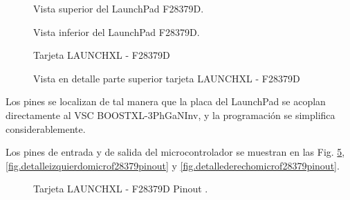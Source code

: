 \documentclass{report}
\begin{document}
\begin{figure}[!h]
    \begin{center}
        \end{center}
        \caption{Vista superior del LaunchPad F28379D.}
        \label{fig.launchpad_superior}
\end{figure}

\begin{figure}[!h]
    \begin{center}
        \end{center}
        \caption{Vista inferior del LaunchPad F28379D.}
        \label{fig.launchpad_inferior}
\end{figure}

\begin{figure}[!h]
    \begin{center}
        \end{center}
        \caption{Tarjeta LAUNCHXL - F28379D \cite{trece}}
        \label{fig.microf28739doverview}
\end{figure}

\begin{figure}[!h]
    \begin{center}
        \end{center}
        \caption{Vista en detalle parte superior tarjeta LAUNCHXL - F28379D \cite{trece}}
        \label{fig.detallemicrof28739doverview}
\end{figure}

Los pines se localizan de tal manera que la placa del LaunchPad se acoplan directamente al VSC BOOSTXL-3PhGaNInv, y la programación se simplifica considerablemente. 

Los pines de entrada y de salida del microcontrolador se muestran en las Fig. \ref{fig.microf28379pinout}, \ref{fig.detalleizquierdomicrof28379pinout} y \ref{fig.detallederechomicrof28379pinout}. 

\begin{figure}[!h]
    \begin{center}
        \end{center}
        \caption{Tarjeta LAUNCHXL - F28379D Pinout \cite{catorce}.}
        \label{fig.microf28379pinout}
\end{figure}
\end{document}
